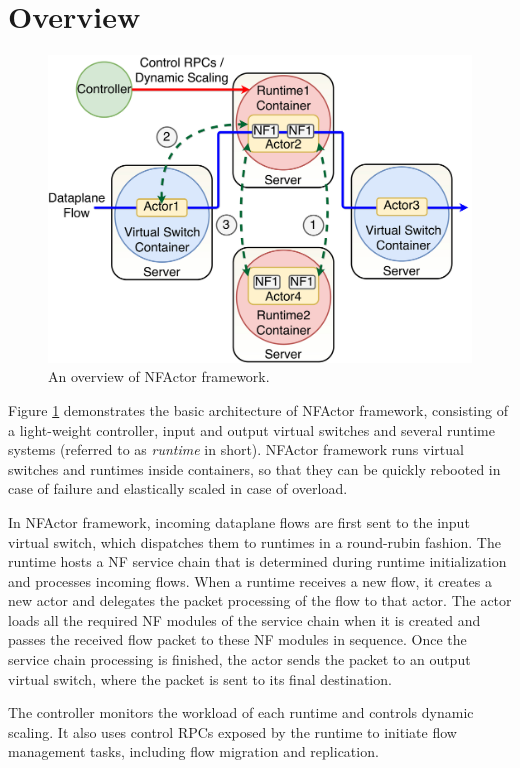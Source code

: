 \section {Overview}

\begin{figure}[!t]
  \centering
  \includegraphics[width=\columnwidth]{figure/final-final-nfactor-cluster.pdf}
  \caption{An overview of NFActor framework.}
  \label{fig:runtime}
\end{figure}

Figure \ref{fig:runtime} demonstrates the basic architecture of NFActor framework, consisting of a light-weight controller, input and output virtual switches and several runtime systems (referred to as \textit{runtime} in short). NFActor framework runs virtual switches and runtimes inside containers, so that they can be quickly rebooted in case of failure and elastically scaled in case of overload.

In NFActor framework, incoming dataplane flows are first sent to the input virtual switch, which dispatches them to runtimes in a round-rubin fashion. The runtime hosts a NF service chain that is determined during runtime initialization and processes incoming flows. When a runtime receives a new flow, it creates a new actor and delegates the packet processing of the flow to that actor. The actor loads all the required NF modules of the service chain when it is created and passes the received flow packet to these NF modules in sequence. Once the service chain processing is finished, the actor sends the packet to an output virtual switch, where the packet is sent to its final destination.

The controller monitors the workload of each runtime and controls dynamic scaling. It also uses control RPCs exposed by the runtime to initiate flow management tasks, including flow migration and replication.
